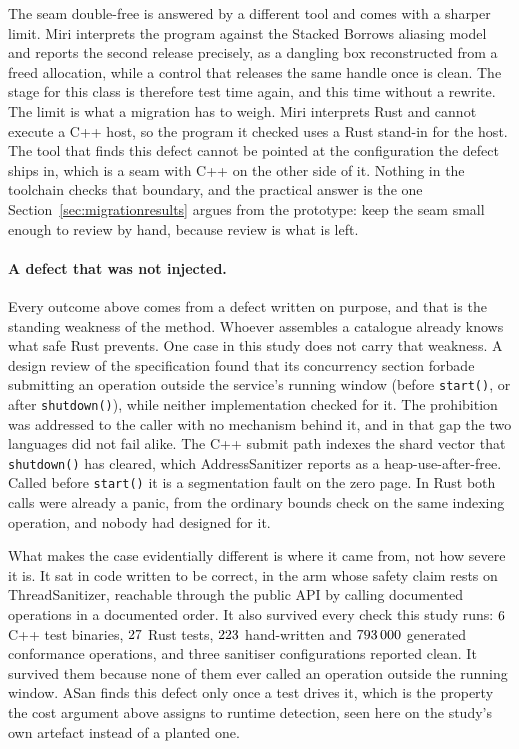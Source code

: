 \documentclass[english,oneside,a4paper,censored,csm,software-track-2020]{HYthesisML}
\begin{document}
The seam double-free is answered by a different tool and comes with a sharper limit. Miri
interprets the program against the Stacked Borrows aliasing model and reports the second
release precisely, as a dangling box reconstructed from a freed allocation, while a control that
releases the same handle once is clean. The stage for this class is therefore test
time again, and this time without a rewrite. The limit is what a migration has to weigh. Miri
interprets Rust and cannot execute a C++ host, so the program it checked uses a Rust stand-in
for the host. The tool that finds this defect cannot be pointed at the configuration the defect
ships in, which is a seam with C++ on the other side of it. Nothing in the toolchain checks
that boundary, and the practical answer is the one
Section~\ref{sec:migrationresults} argues from the prototype: keep the seam small enough to
review by hand, because review is what is left.

\paragraph{A defect that was not injected.}
Every outcome above comes from a defect written on purpose, and that is the standing weakness of
the method. Whoever assembles a catalogue already knows what safe Rust prevents. One case in
this study does not carry that weakness. A design review of the specification found that its
concurrency section forbade submitting an operation outside the service's running window
(before \texttt{start()}, or after \texttt{shutdown()}), while neither implementation checked
for it. The prohibition was addressed to the caller with no mechanism behind it, and in that gap
the two languages did not fail alike. The C++ submit path indexes the shard vector that
\texttt{shutdown()} has cleared, which AddressSanitizer reports as a heap-use-after-free. Called
before \texttt{start()} it is a segmentation fault on the zero page. In Rust both calls were
already a panic, from the ordinary bounds check on the same indexing operation, and nobody had
designed for it.

What makes the case evidentially different is where it came from, not how severe it is. It sat in
code written to be correct, in the arm whose safety claim rests on ThreadSanitizer, reachable
through the public API by calling documented operations in a documented order. It also survived
every check this study runs: $6$ C++ test binaries, $27$ Rust tests,
$223$ hand-written and $793\,000$ generated conformance operations, and three
sanitiser configurations reported clean. It survived them because none of them ever called an
operation outside the running window. ASan finds this defect only once a test drives it, which is
the property the cost argument above assigns to runtime detection, seen here on the study's own
artefact instead of a planted one.
\end{document}
